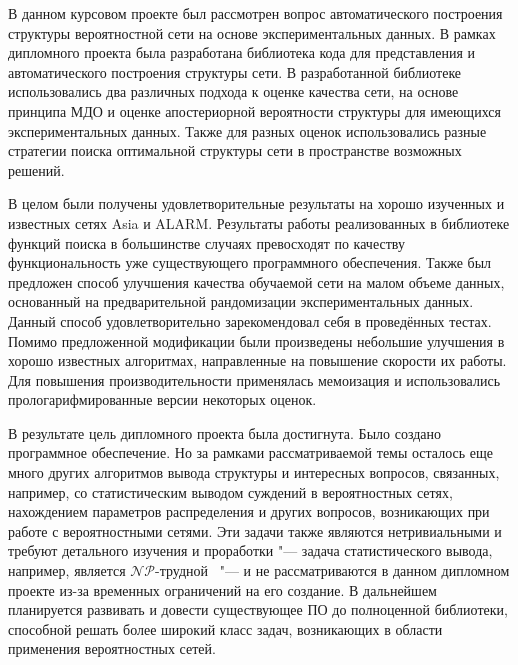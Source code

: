 

В данном курсовом проекте был рассмотрен вопрос автоматического построения структуры вероятностной сети на основе экспериментальных данных.
В рамках дипломного проекта была разработана библиотека кода для представления и автоматического построения структуры сети.
В разработанной библиотеке использовались два различных подхода к оценке качества сети, на основе принципа МДО и оценке апостериорной вероятности структуры для имеющихся экспериментальных данных.
Также для разных оценок использовались разные стратегии поиска оптимальной структуры сети в пространстве возможных решений.

В целом были получены удовлетворительные результаты на хорошо изученных и известных сетях Asia и ALARM.
Результаты работы реализованных в библиотеке функций поиска в большинстве случаях превосходят по качеству функциональность уже существующего программного обеспечения.
Также был предложен способ улучшения качества обучаемой сети на малом объеме данных, основанный на предварительной рандомизации экспериментальных данных.
Данный способ удовлетворительно зарекомендовал себя в проведённых тестах.
Помимо предложенной модификации были произведены небольшие улучшения в хорошо известных алгоритмах, направленные на повышение скорости их работы.
Для повышения производительности применялась мемоизация и использовались прологарифмированные версии некоторых оценок.

В результате цель дипломного проекта была достигнута.
Было создано программное обеспечение.
Но за рамками рассматриваемой темы осталось еще много других алгоритмов вывода структуры и интересных вопросов, связанных, например, со статистическим выводом суждений в вероятностных сетях, нахождением параметров распределения и других вопросов, возникающих при работе с вероятностными сетями.
Эти задачи также являются нетривиальными и требуют детального изучения и проработки "--- задача статистического вывода, например, является $\mathcal{NP}$-трудной~\cite{Koller_2009} "--- и не рассматриваются в данном дипломном проекте из-за временных ограничений на его создание.
В дальнейшем планируется развивать и довести существующее ПО до полноценной библиотеки, способной решать более широкий класс задач, возникающих в области применения вероятностных сетей.
